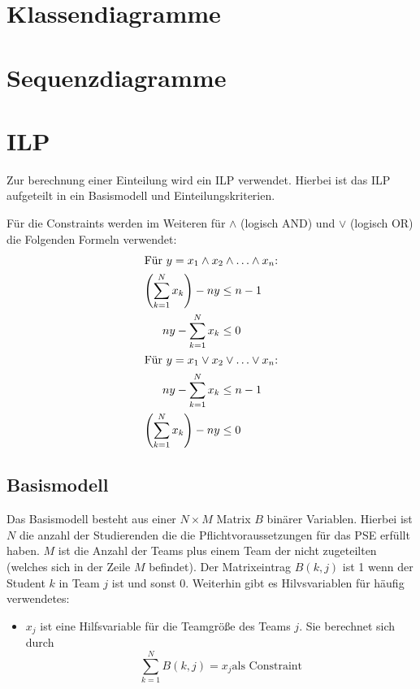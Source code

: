 \documentclass[parskip=full]{scrartcl}
\begin{document}
\section{Klassendiagramme}








\section{Sequenzdiagramme}

\section{ILP}
Zur berechnung einer Einteilung wird ein ILP verwendet. Hierbei ist das ILP
aufgeteilt in ein Basismodell und Einteilungskriterien. 

Für die Constraints werden im Weiteren für $\wedge$ (logisch AND) und
$\vee$ (logisch OR) die Folgenden Formeln verwendet:
\begin{align*}
\intertext{Für $y = x_1 \wedge x_2 \wedge \ldots \wedge x_n$:} 
\left(\sum_{k=1}^{N}x_k \right)-ny & \le n-1\\
ny - \sum_{k=1}^{N}x_k & \le 0\\
\intertext{Für  $y = x_1 \vee x_2 \vee \ldots \vee x_n$:}
ny - \sum_{k=1}^{N}x_k & \le n-1\\
\left(\sum_{k=1}^{N}x_k \right) - ny  &\le 0
\end{align*}
\subsection{Basismodell}
Das Basismodell besteht aus einer $N \times M$ Matrix $B$ binärer Variablen.
Hierbei ist $N$ die anzahl der Studierenden die die Pflichtvoraussetzungen für das PSE
erfüllt haben. $M$ ist die Anzahl der Teams plus einem Team
der nicht zugeteilten (welches sich in der Zeile $M$ befindet). Der
Matrixeintrag $B(k,j)$ ist 1 wenn der Student $k$ in Team $j$ ist und sonst 0.
Weiterhin gibt es Hilvsvariablen für häufig verwendetes: 
\begin{itemize}
  \item $x_j$ ist eine Hilfsvariable für die Teamgröße des Teams $j$. Sie berechnet
sich durch
\begin{equation*}
\sum_{k = 1}^{N} B(k,j) = x_j  \text{
als Constraint}
\end{equation*}
\end{itemize}
\end{document}
